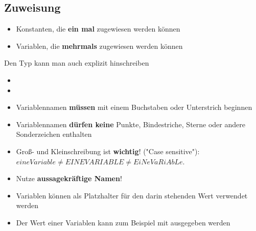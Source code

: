 \subsection{Zuweisung}
\begin{frame}
    \slidehead
    \begin{itemize}[<+->]
        \item Konstanten, die \textbf{ein mal} zugewiesen werden können\\
            \vspace{1em}
        \item Variablen, die \textbf{mehrmals} zugewiesen werden können\\
    \end{itemize}
    \pause
\end{frame}

\begin{frame}
    \slidehead
    Den Typ kann man auch explizit hinschreiben
    \vspace{1em}
    \begin{itemize}
        \item {}
            \vspace{1em}
        \item {}
    \end{itemize}
    \pause
\end{frame}

\begin{frame}
    \slidehead

    \begin{itemize}[<+->]
        \item Variablennamen \textbf{müssen} mit einem Buchstaben oder Unterstrich beginnen
        \item Variablennamen \textbf{dürfen keine} Punkte, Bindestriche, Sterne oder andere Sonderzeichen enthalten
        \item Groß- und Kleinschreibung ist \textbf{wichtig}! ("Case sensitive"):\\ $eineVariable \neq EINEVARIABLE \neq EiNeVaRiAbLe$.
        \item Nutze \textbf{aussagekräftige Namen}!
        \item Variablen können als Platzhalter für den darin stehenden Wert verwendet werden
        \item Der Wert einer Variablen kann zum Beispiel mit  ausgegeben werden
    \end{itemize}
\end{frame}

